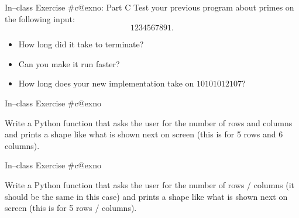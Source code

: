 \documentclass[aspectratio=169, 12pt, xcolor=table]{beamer}
\makeatletter
\newcommand{\arabicthree}[1]{\expandafter\@arabicthree\csname c@#1\endcsname}
\newcommand{\@arabicthree}[1]{\ifnum #1<100 0\fi\ifnum #1<10 0\fi\number#1}
\newcounter{exno}
\newcommand{\exno}{\stepcounter{exno}In--class Exercise \#\arabicthree{exno}}
\makeatother
\begin{document}
	\addtocounter{exno}{-1}
	
	\begin{frame}{\exno: Part C}
		Test your previous program about primes on the following input:
		\[1234567891.\]
		\vspace{-\topsep}
		\begin{itemize}
			\item How long did it take to terminate?
			\item Can you make it run faster?
			\item How long does your new implementation take on $10101012107$?
		\end{itemize}
	\end{frame}

	\begin{frame}{\exno}
		\begin{minipage}{0.5\textwidth}
			Write a Python function that asks the user for the number of rows and columns and prints a shape like what is shown next on screen (this is for 5 rows and 6 columns).
		\end{minipage}\hfill
		\begin{minipage}{0.45\textwidth}
			\centering
		\end{minipage}
	\end{frame}

	\begin{frame}{\exno}
		\begin{minipage}{0.5\textwidth}
			Write a Python function that asks the user for the number of rows / columns (it should be the same in this case) and prints a shape like what is shown next on screen (this is for 5 rows / columns).
		\end{minipage}\hfill
		\begin{minipage}{0.45\textwidth}
			\centering
		\end{minipage}
	\end{frame}
\end{document}
